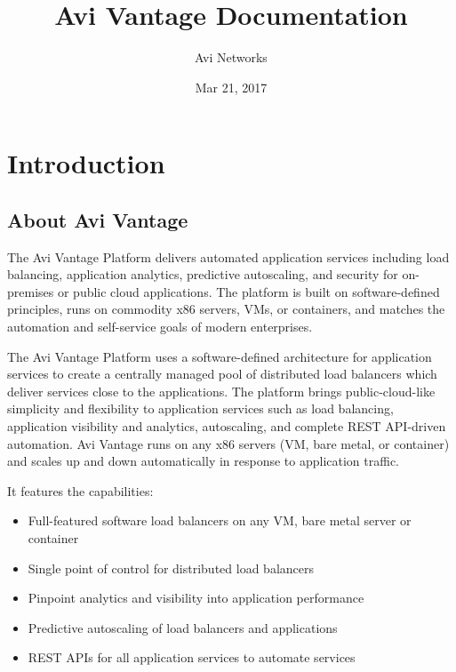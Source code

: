 \documentclass[letterpaper,10pt,english]{sphinxmanual}
\title{Avi Vantage Documentation}
\date{Mar 21, 2017}
\author{Avi Networks}
\begin{document}
\maketitle
\sphinxtableofcontents
{}\label{\detokenize{index::doc}}



\chapter{Introduction}
\label{\detokenize{introduction:introduction}}\label{\detokenize{introduction::doc}}\label{\detokenize{introduction:avi-vantage-documentation}}

\section{About Avi Vantage}
\label{\detokenize{introduction:about-avi-vantage}}
The Avi Vantage Platform delivers automated application services including load balancing, application analytics, predictive autoscaling, and security for on-premises or public cloud applications. The platform is built on software-defined principles, runs on commodity x86 servers, VMs, or containers, and matches the automation and self-service goals of modern enterprises.

The Avi Vantage Platform uses a software-defined architecture for application services to create a centrally managed pool of distributed load balancers which deliver services close to the applications.
The platform brings public-cloud-like simplicity and flexibility to application services such as load balancing, application visibility and analytics, autoscaling, and complete REST API-driven automation. Avi Vantage runs on any x86 servers (VM, bare metal, or container) and scales up and down automatically in response to application traffic.

It features the capabilities:
\begin{itemize}
\item {} 
Full-featured software load balancers on any VM, bare metal server or container

\item {} 
Single point of control for distributed load balancers

\item {} 
Pinpoint analytics and visibility into application performance

\item {} 
Predictive autoscaling of load balancers and applications

\item {} 
REST APIs for all application services to automate services

\end{itemize}
\end{document}
